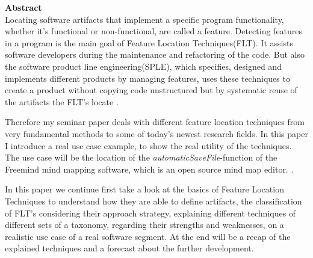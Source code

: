 \vspace*{2cm}

{\bf\Large Abstract} \\ [1em]
Locating software artifacts that implement a specific program functionality, whether it's functional or non-functional, are called a feature. Detecting features in a program is the main goal of Feature Location Techniques(FLT). It assists software developers during the maintenance and refactoring of the code.
But also the software product line engineering(SPLE), which specifies, designed and implements different products by managing features, uses these techniques to create a product without copying code unstructured but by systematic reuse of the artifacts the FLT's locate \cite{pohl2005software}.

Therefore my seminar paper deals with different feature location techniques from very fundamental methods to some of today's newest research fields. In this paper I introduce a real use case example, to show the real utility of the techniques. The use case will be the location of the \textit{automaticSaveFile}-function of the Freemind mind mapping software, which is an open source mind map editor. \cite{FrM16}.

In this paper we continue first take a look at the basics of Feature Location Techniques to understand how they are able to define artifacts, the classification of FLT's considering their approach strategy, explaining different techniques of different sets of a taxonomy, regarding their strengths and weaknesses, on a realistic use case of a real software segment. At the end will be a recap of the explained techniques and a forecast about the further development.

\cleardoublepage
